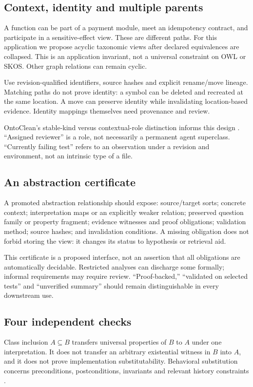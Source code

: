 \documentclass[11pt]{article}
\begin{document}
\subsection{Context, identity and multiple parents}
A function can be part of a payment module, meet an idempotency contract, and participate in a sensitive-effect view. These are different paths. For this application we propose acyclic taxonomic views after declared equivalences are collapsed. This is an application invariant, not a universal constraint on OWL or SKOS. Other graph relations can remain cyclic.

Use revision-qualified identifiers, source hashes and explicit rename/move lineage. Matching paths do not prove identity: a symbol can be deleted and recreated at the same location. A move can preserve identity while invalidating location-based evidence. Identity mappings themselves need provenance and review.

OntoClean's stable-kind versus contextual-role distinction informs this design \citep{ontoclean2009}. ``Assigned reviewer'' is a role, not necessarily a permanent agent superclass. ``Currently failing test'' refers to an observation under a revision and environment, not an intrinsic type of a file.

\subsection{An abstraction certificate}
A promoted abstraction relationship should expose: source/target sorts; concrete context; interpretation maps or an explicitly weaker relation; preserved question family or property fragment; evidence witnesses and proof obligations; validation method; source hashes; and invalidation conditions. A missing obligation does not forbid storing the view: it changes its status to hypothesis or retrieval aid.

This certificate is a proposed interface, not an assertion that all obligations are automatically decidable. Restricted analyses can discharge some formally; informal requirements may require review. ``Proof-backed,'' ``validated on selected tests'' and ``unverified summary'' should remain distinguishable in every downstream use.

\subsection{Four independent checks}
Class inclusion $A\subseteq B$ transfers universal properties of $B$ to $A$ under one interpretation. It does not transfer an arbitrary existential witness in $B$ into $A$, and it does not prove implementation substitutability. Behavioral substitution concerns preconditions, postconditions, invariants and relevant history constraints \citep{liskov1994}.
\end{document}
